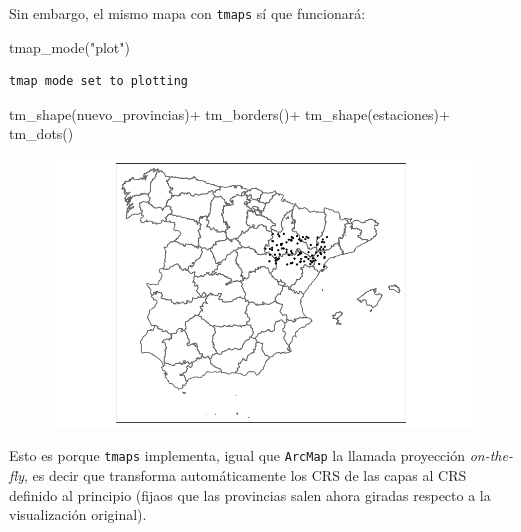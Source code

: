 \documentclass[
  letterpaper,
  DIV=11,
  numbers=noendperiod]{scrreprt}
\newenvironment{Shaded}{\begin{snugshade}}{\end{snugshade}}
\newcommand{\FunctionTok}[1]{\textcolor[rgb]{0.28,0.35,0.67}{#1}}
\newcommand{\NormalTok}[1]{\textcolor[rgb]{0.00,0.23,0.31}{#1}}
\newcommand{\SpecialCharTok}[1]{\textcolor[rgb]{0.37,0.37,0.37}{#1}}
\newcommand{\StringTok}[1]{\textcolor[rgb]{0.13,0.47,0.30}{#1}}
\begin{document}
Sin embargo, el mismo mapa con \texttt{tmaps} sí que funcionará:

\begin{Shaded}
\begin{Highlighting}[]
\FunctionTok{tmap\_mode}\NormalTok{(}\StringTok{"plot"}\NormalTok{)}
\end{Highlighting}
\end{Shaded}

\begin{verbatim}
tmap mode set to plotting
\end{verbatim}

\begin{Shaded}
\begin{Highlighting}[]
\FunctionTok{tm\_shape}\NormalTok{(nuevo\_provincias)}\SpecialCharTok{+}
    \FunctionTok{tm\_borders}\NormalTok{()}\SpecialCharTok{+}
    \FunctionTok{tm\_shape}\NormalTok{(estaciones)}\SpecialCharTok{+}
    \FunctionTok{tm\_dots}\NormalTok{()}
\end{Highlighting}
\end{Shaded}

\begin{figure}[H]

{\centering \includegraphics{03_DatosEspaciales_files/figure-pdf/unnamed-chunk-35-1.pdf}

}

\end{figure}

Esto es porque \texttt{tmaps} implementa, igual que \texttt{ArcMap} la
llamada proyección \emph{on-the-fly}, es decir que transforma
automáticamente los CRS de las capas al CRS definido al principio
(fijaos que las provincias salen ahora giradas respecto a la
visualización original).
\end{document}
